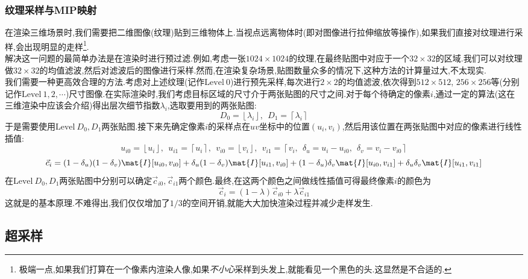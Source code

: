 \documentclass{ctexart}
\begin{document}
\subsubsection{纹理采样与MIP映射}
在渲染三维场景时,我们需要把二维图像(纹理)贴到三维物体上.当视点远离物体时(即对图像进行拉伸缩放等操作),如果我们直接对纹理进行采样,会出现明显的走样\footnote{极端一点,如果我们打算在一个像素内渲染人像,如果\textit{不小心}采样到头发上,就能看见一个黑色的头.这显然是不合适的.}.\\
\indent 解决这一问题的最简单办法是在渲染时进行预过滤.例如,考虑一张$1024\times1024$的纹理,在最终贴图中对应于一个$32\times32$的区域.我们可以对纹理做$32\times32$的均值滤波,然后对滤波后的图像进行采样.然而,在渲染复杂场景,贴图数量众多的情况下,这种方法的计算量过大,不太现实.\\
\indent 我们需要一种更高效合理的方法.考虑对上述纹理(记作$\text{Level}\ 0$)进行预先采样,每次进行$2\times2$的均值滤波,依次得到$512\times512$, $256\times256$等(分别记作$\text{Level}\ 1,2,\cdots$)尺寸图像.在实际渲染时,我们考虑目标区域的尺寸介于两张贴图的尺寸之间.对于每个待确定的像素$i$,通过一定的算法(这在三维渲染中应该会介绍)得出层次细节指数$\lambda_i$,选取要用到的两张贴图:
\[D_0=\left\lfloor \lambda_i\right\rfloor,\ \ D_1=\left\lceil \lambda_i\right\rceil\]
于是需要使用$\text{Level}\ D_0,D_1$两张贴图.接下来先确定像素$i$的采样点在$uv$坐标中的位置$\left(u_i,v_i\right)$,然后用该位置在两张贴图中对应的像素进行线性插值:
\[u_{i0}=\left\lfloor u_i\right\rfloor,\ \ u_{i1}=\left\lceil u_i\right\rceil,\ \ v_{i0}=\left\lfloor v_i\right\rfloor,\ \ v_{i1}=\left\lceil v_i,\ \ \delta_u=u_i-u_{i0},\ \ \delta_v=v_i-v_{i0}\right\rceil\]
\[\vec{c}_{i}=(1-\delta_u)(1-\delta_v)\mat{I}[u_{i0},v_{i0}]+\delta_u(1-\delta_v)\mat{I}[u_{i1},v_{i0}]+(1-\delta_u)\delta_v\mat{I}[u_{i0},v_{i1}]+\delta_u\delta_v\mat{I}[u_{i1},v_{i1}]\]
在$\text{Level}\ D_0,D_1$两张贴图中分别可以确定$\vec{c}_{i0},\vec{c}_{i1}$两个颜色.最终,在这两个颜色之间做线性插值可得最终像素$i$的颜色为
\[\vec{c}_i=(1-\lambda)\vec{c}_{i0}+\lambda\vec{c}_{i1}\]
这就是的基本原理.不难得出,我们仅仅增加了$1/3$的空间开销,就能大大加快渲染过程并减少走样发生.
\subsection{超采样}
\end{document}
